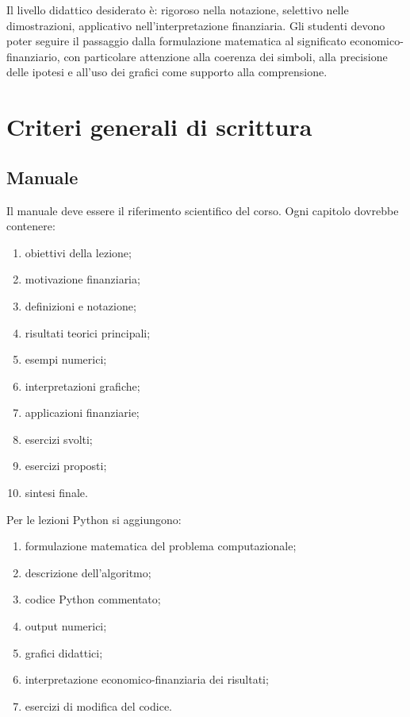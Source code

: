 \documentclass[12pt,a4paper]{article}%
\begin{document}
Il livello didattico desiderato \`{e}: rigoroso nella notazione, selettivo
nelle dimostrazioni, applicativo nell'interpretazione finanziaria. Gli
studenti devono poter seguire il passaggio dalla formulazione matematica al
significato economico-finanziario, con particolare attenzione alla coerenza
dei simboli, alla precisione delle ipotesi e all'uso dei grafici come supporto
alla comprensione.

\section{Criteri generali di scrittura}

\subsection{Manuale}

Il manuale deve essere il riferimento scientifico del corso. Ogni capitolo
dovrebbe contenere:

\begin{enumerate}
\item obiettivi della lezione;

\item motivazione finanziaria;

\item definizioni e notazione;

\item risultati teorici principali;

\item esempi numerici;

\item interpretazioni grafiche;

\item applicazioni finanziarie;

\item esercizi svolti;

\item esercizi proposti;

\item sintesi finale.
\end{enumerate}

Per le lezioni Python si aggiungono:

\begin{enumerate}
\item formulazione matematica del problema computazionale;

\item descrizione dell'algoritmo;

\item codice Python commentato;

\item output numerici;

\item grafici didattici;

\item interpretazione economico-finanziaria dei risultati;

\item esercizi di modifica del codice.
\end{enumerate}
\end{document}
